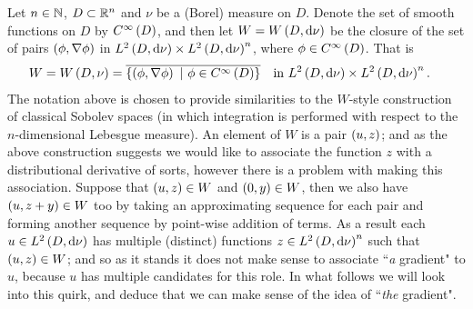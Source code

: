 Let $n\in\mathbb{N}$, $D\subset\mathbb{R}^n$ and $\nu$ be a (Borel) measure on $D$.
Denote the set of smooth functions on $D$ by $C^{\infty}\left( D \right)$, and then let $W=W\left( D,\mathrm{d}\nu \right)$ be the closure of the set of pairs $\left( \phi,\nabla\phi \right)$ in $L^{2}\left( D,\mathrm{d}\nu \right)\times L^{2}\left( D,\mathrm{d}\nu \right)^n$, where $\phi\in C^{\infty}\left( D \right)$.
That is
\begin{align*}
	W = W\bracs{D,\nu} &= \overline{\clbracs{\bracs{\phi,\grad\phi} \ \vert \ \phi\in\smooth{D}}} \quad \text{in} \ \ltwo{D}{\nu}\times\ltwo{D}{\nu}^n.
\end{align*}
The notation above is chosen to provide similarities to the $W$-style construction of classical Sobolev spaces (in which integration is performed with respect to the $n$-dimensional Lebesgue measure).
An element of $W$ is a pair $\left( u,z \right)$; and as the above construction suggests we would like to associate the function $z$ with a distributional derivative of sorts, however there is a problem with making this association.
Suppose that $\left( u,z \right)\in W$ and $\left( 0,y \right)\in W$, then we also have $\left( u,z+y \right)\in W$ too by taking an approximating sequence for each pair and forming another sequence by point-wise addition of terms.
As a result each $u\in L^{2}\left( D,\mathrm{d}\nu \right)$ has multiple (distinct) functions $z\in L^{2}\left( D,\mathrm{d}\nu \right)^n$ such that $\left( u,z \right)\in W$; and so as it stands it does not make sense to associate ``\textit{a} gradient" to $u$, because $u$ has multiple candidates for this role.
In what follows we will look into this quirk, and deduce that we can make sense of the idea of ``\textit{the} gradient". \newline

